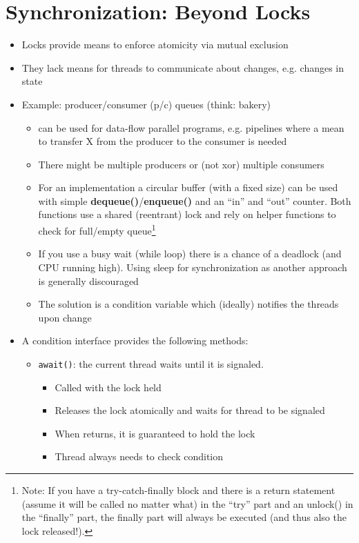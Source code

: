\documentclass[a4paper]{article}
\newcommand{\inline}[1]{\lstinline!#1!}%
\begin{document}
\section{Synchronization: Beyond Locks}
\begin{itemize}
\item Locks provide means to enforce atomicity via mutual exclusion 
\item They lack means for threads to communicate about changes, e.g. changes in state
\item Example: producer/consumer (p/c) queues (think: bakery)
\begin{itemize}
\item can be used for data-flow parallel programs, e.g. pipelines where a mean to transfer X from the producer to the consumer is needed
\item There might be multiple producers or (not xor) multiple consumers
\item For an implementation a circular buffer (with a fixed size) can be used with simple \textbf{dequeue()}/\textbf{enqueue()} and an “in” and “out” counter. Both functions use a shared (reentrant) lock and rely on helper functions to check for full/empty queue\footnote{Note: If you have a try-catch-finally block and there is a return statement (assume it will be called no matter what) in the ``try'' part and an unlock() in the ``finally'' part, the finally part will always be executed (and thus also the lock released!).}
\item If you use a busy wait (while loop) there is a chance of a deadlock (and CPU running high). Using sleep for synchronization as another approach is generally discouraged
\item The solution is a condition variable which (ideally) notifies the threads upon change
\end{itemize}
\item A condition interface provides the following methods:
\begin{itemize}
\item \inline{await()}: the current thread waits until it is signaled. 
\begin{itemize}
\item Called with the lock held
\item Releases the lock atomically and waits for thread to be signaled
\item When returns, it is guaranteed to hold the lock
\item Thread always needs to check condition
\end{itemize}

\end{itemize}
\end{itemize}
\end{document}
